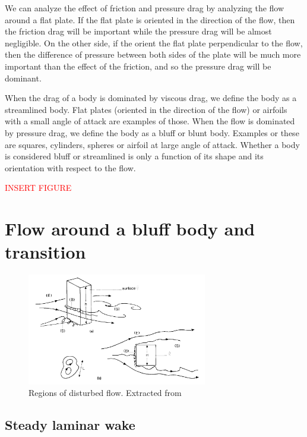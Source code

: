 \documentclass[journal]{new-aiaa}
\begin{document}
We can analyze the effect of friction and pressure drag by analyzing the flow around a flat plate. If the flat plate is oriented in the direction of the flow, then the friction drag will be important while the pressure drag will be almost negligible. On the other side, if the orient the flat plate perpendicular to the flow, then the difference of pressure between both sides of the plate will be much more important than the effect of the friction, and so the pressure drag will be dominant.

When the drag of a body is dominated by viscous drag, we define the body as a streamlined body. Flat plates (oriented in the direction of the flow) or  airfoils with a small angle of attack are examples of those. When the flow is dominated by pressure drag, we define the body as a bluff or blunt body. Examples or these are squares, cylinders, spheres or airfoil at large angle of attack. Whether a body is considered bluff or streamlined is only a function of its shape and its orientation with respect to the flow.

\begin{center}
\textcolor{red}{INSERT FIGURE}
\end{center}



\section{Flow around a bluff body and transition}

\begin{figure}[H]
\begin{center}
\includegraphics[width=0.7\textwidth]{Images/federico/Figure01}
\caption{ Regions of disturbed flow. Extracted from \cite{hunt1990} }
\label{fig:RegionsFlow}
\end{center}
\end{figure}

\subsection{Steady laminar wake}
\end{document}
